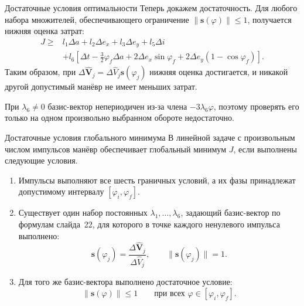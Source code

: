 \documentclass[11pt,aspectratio=169,t]{beamer}
\newcommand{\eqcompact}{\fontsize{10}{12}\selectfont}
\begin{document}
\begin{frame}{Достаточные условия оптимальности}
\relax
\derivationmathspacing
\justifying
Теперь докажем достаточность. Для любого набора множителей,
обеспечивающего ограничение $\|\boldsymbol s(\varphi)\|\leq1$,
получается нижняя оценка затрат:
{\derivationmathspacing
\[
\begin{aligned}
 J\geq{}&l_1\Delta a+l_2\Delta e_x+l_3\Delta e_y+l_5\Delta i\\
       &+l_6\left[\Delta t-\frac32\varphi_f\Delta a
          +2\Delta e_x\sin\varphi_f+2\Delta e_y(1-\cos\varphi_f)\right].
\end{aligned}
\]
}
\medskip
\justifying
Таким образом, при
$\Delta\widehat{\boldsymbol V}_j=\Delta\widehat V_j\boldsymbol s(\varphi_j)$
нижняя оценка достигается, и никакой другой допустимый манёвр
не имеет меньших затрат.
\par\smallskip
При $\lambda_6\ne0$ базис-вектор непериодичен из-за члена
$-3\lambda_6\varphi$, поэтому проверять его только на одном
произвольно выбранном обороте недостаточно.
\end{frame}

\begin{frame}{Достаточные условия глобального минимума}
\relax
\derivationmathspacing
\justifying
В линейной задаче с произвольным числом импульсов манёвр
обеспечивает глобальный минимум $J$, если выполнены следующие условия.
\begin{enumerate}
\setlength{\itemsep}{0pt}
 \item Импульсы выполняют все шесть граничных
 условий, а их фазы принадлежат
 допустимому интервалу $[\varphi_i,\varphi_f]$.
 \item Существует один набор постоянных
 $\lambda_1,\ldots,\lambda_6$, задающий базис-вектор
 по формулам слайда~22, для которого в точке
 каждого ненулевого импульса выполнено:
 {\eqcompact\derivationmathspacing
\[
\boldsymbol s(\varphi_j)
     =\frac{\Delta\widehat{\boldsymbol V}_j}{\Delta\widehat V_j},
  \qquad \|\boldsymbol s(\varphi_j)\|=1.
\]
}
 \item Для того же базис-вектора выполнено достаточное
 условие:
 {\eqcompact\derivationmathspacing
\[
\|\boldsymbol s(\varphi)\|\leq1
  \qquad\text{при всех }\varphi\in[\varphi_i,\varphi_f].
\]
}
\end{enumerate}
\end{frame}
\end{document}
